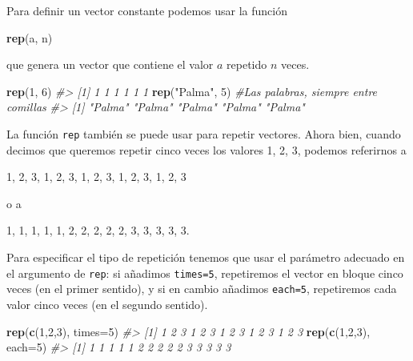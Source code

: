 \documentclass[
]{book}
\newenvironment{Shaded}{\begin{snugshade}}{\end{snugshade}}
\newcommand{\CommentTok}[1]{\textcolor[rgb]{0.56,0.35,0.01}{\textit{#1}}}
\newcommand{\DataTypeTok}[1]{\textcolor[rgb]{0.13,0.29,0.53}{#1}}
\newcommand{\DecValTok}[1]{\textcolor[rgb]{0.00,0.00,0.81}{#1}}
\newcommand{\KeywordTok}[1]{\textcolor[rgb]{0.13,0.29,0.53}{\textbf{#1}}}
\newcommand{\NormalTok}[1]{#1}
\newcommand{\StringTok}[1]{\textcolor[rgb]{0.31,0.60,0.02}{#1}}
\theoremstyle{definition}
\theoremstyle{definition}
\theoremstyle{definition}
\theoremstyle{remark}
\begin{document}
Para definir un vector constante podemos usar la función

\begin{Shaded}
\begin{Highlighting}[]
\KeywordTok{rep}\NormalTok{(a, n)}
\end{Highlighting}
\end{Shaded}

que genera un vector que contiene el valor \(a\) repetido \(n\) veces.

\begin{Shaded}
\begin{Highlighting}[]
\KeywordTok{rep}\NormalTok{(}\DecValTok{1}\NormalTok{, }\DecValTok{6}\NormalTok{)}
\CommentTok{\#\textgreater{} [1] 1 1 1 1 1 1}
\KeywordTok{rep}\NormalTok{(}\StringTok{"Palma"}\NormalTok{, }\DecValTok{5}\NormalTok{) }\CommentTok{\#Las palabras, siempre entre comillas}
\CommentTok{\#\textgreater{} [1] "Palma" "Palma" "Palma" "Palma" "Palma"}
\end{Highlighting}
\end{Shaded}

La función \texttt{rep} también se puede usar para repetir vectores. Ahora bien, cuando decimos que queremos repetir cinco veces los valores 1, 2, 3, podemos referirnos a

1, 2, 3, 1, 2, 3, 1, 2, 3, 1, 2, 3, 1, 2, 3

o a

1, 1, 1, 1, 1, 2, 2, 2, 2, 2, 3, 3, 3, 3, 3.

Para especificar el tipo de repetición tenemos que usar el parámetro adecuado en el argumento de \texttt{rep}: si añadimos \texttt{times=5}, repetiremos el vector en bloque cinco veces (en el primer sentido), y si en cambio añadimos \texttt{each=5}, repetiremos cada valor cinco veces (en el segundo sentido).

\begin{Shaded}
\begin{Highlighting}[]
\KeywordTok{rep}\NormalTok{(}\KeywordTok{c}\NormalTok{(}\DecValTok{1}\NormalTok{,}\DecValTok{2}\NormalTok{,}\DecValTok{3}\NormalTok{), }\DataTypeTok{times=}\DecValTok{5}\NormalTok{)}
\CommentTok{\#\textgreater{}  [1] 1 2 3 1 2 3 1 2 3 1 2 3 1 2 3}
\KeywordTok{rep}\NormalTok{(}\KeywordTok{c}\NormalTok{(}\DecValTok{1}\NormalTok{,}\DecValTok{2}\NormalTok{,}\DecValTok{3}\NormalTok{), }\DataTypeTok{each=}\DecValTok{5}\NormalTok{)}
\CommentTok{\#\textgreater{}  [1] 1 1 1 1 1 2 2 2 2 2 3 3 3 3 3}
\end{Highlighting}
\end{Shaded}
\end{document}
